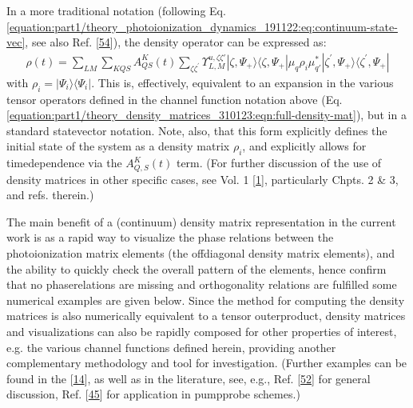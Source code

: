 \documentclass[letterpaper,table,10pt,english]{jupyterBook}
\begin{document}
\sphinxAtStartPar
In a more traditional notation (following Eq. \eqref{equation:part1/theory_photoionization_dynamics_191122:eq:continuum-state-vec}, see also Ref. {[}\hyperlink{cite.backmatter/bibliography:id536}{54}{]}), the density operator can be expressed as:
\begin{equation}\label{equation:part1/theory_density_matrices_310123:eqn:full-density-mat-traditional}
\begin{split}
\rho(t) =\sum_{LM}\sum_{KQS}A^{K}_{QS}(t)\sum_{\zeta\zeta^{\prime}}\varUpsilon_{L,M}^{u,\zeta\zeta'}|\zeta,\Psi_+\rangle\langle\zeta,\Psi_+|\mu_q\rho_i\mu_{q\prime}^{*}|\zeta^{\prime},\Psi_+\rangle\langle\zeta^{\prime},\Psi_+|
\end{split}
\end{equation}
\sphinxAtStartPar
with \(\rho_i = |\Psi_i\rangle\langle\Psi_i|\). This is, effectively, equivalent to an expansion in the various tensor operators defined in the channel function notation above (Eq. \eqref{equation:part1/theory_density_matrices_310123:eqn:full-density-mat}), but in a standard state\sphinxhyphen{}vector notation. Note, also, that this form explicitly defines the initial state of the system as a density matrix \(\rho_i\), and explicitly allows for time\sphinxhyphen{}dependence via the \(A_{Q,S}^{K}(t)\) term. (For further discussion of the use of density matrices in other specific cases, see  Vol. 1 {[}\hyperlink{cite.backmatter/bibliography:id569}{1}{]}, particularly Chpts. 2 \& 3, and refs. therein.)

\sphinxAtStartPar
The main benefit of a (continuum) density matrix representation in the current work is as a rapid way to visualize the phase relations between the photoionization matrix elements (the off\sphinxhyphen{}diagonal density matrix elements), and the ability to quickly check the overall pattern of the elements, hence confirm that no phase\sphinxhyphen{}relations are missing and orthogonality relations are fulfilled \sphinxhyphen{} some numerical examples are given below. Since the method for computing the density matrices is also numerically equivalent to a tensor outer\sphinxhyphen{}product, density matrices and visualizations can also be rapidly composed for other properties of interest, e.g. the various channel functions defined herein, providing another complementary methodology and tool for investigation. (Further examples can be found in the  {[}\hyperlink{cite.backmatter/bibliography:id506}{14}{]}, as well as in the literature, see, e.g., Ref. {[}\hyperlink{cite.backmatter/bibliography:id444}{52}{]} for general discussion, Ref. {[}\hyperlink{cite.backmatter/bibliography:id694}{45}{]} for application in pump\sphinxhyphen{}probe schemes.)
\end{document}
